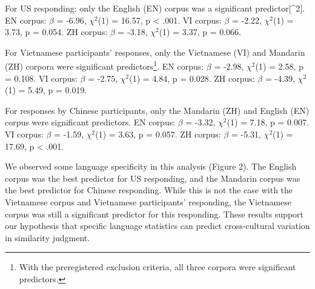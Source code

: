 \documentclass[10pt, letterpaper]{article}
\begin{document}
For US responding: only the English (EN) corpus was a significant
predictor{[}\^{}2{]}. EN corpus: \(\beta\) = -6.96, \(\chi^2\)(1) =
16.57, p \textless{} .001. VI corpus: \(\beta\) = -2.22, \(\chi^2\)(1) =
3.73, p = 0.054. ZH corpus: \(\beta\) = -3.18, \(\chi^2\)(1) = 3.37, p =
0.066.

For Vietnamese participants' responses, only the Vietnamese (VI) and
Mandarin (ZH) corpora were significant predictors\footnote{With the
  preregistered exclusion criteria, all three corpora were significant
  predictors.}. EN corpus: \(\beta\) = -2.98, \(\chi^2\)(1) = 2.58, p =
0.108. VI corpus: \(\beta\) = -2.75, \(\chi^2\)(1) = 4.84, p = 0.028. ZH
corpus: \(\beta\) = -4.39, \(\chi^2\)(1) = 5.49, p = 0.019.

For responses by Chinese participants, only the Mandarin (ZH) and
English (EN) corpus were significant predictors. EN corpus: \(\beta\) =
-3.32, \(\chi^2\)(1) = 7.18, p = 0.007. VI corpus: \(\beta\) = -1.59,
\(\chi^2\)(1) = 3.63, p = 0.057. ZH corpus: \(\beta\) = -5.31,
\(\chi^2\)(1) = 17.69, p \textless{} .001.

We observed some language specificity in this analysis (Figure 2). The
English corpus was the best predictor for US responding, and the
Mandarin corpus was the best predictor for Chinese responding. While
this is not the case with the Vietnamese corpus and Vietnamese
participants' responding, the Vietnamese corpus was still a significant
predictor for this responding. These results support our hypothesis that
specific language statistics can predict cross-cultural variation in
similarity judgment.
\end{document}
